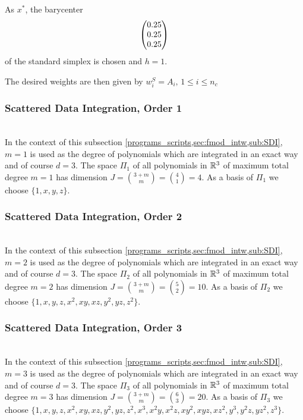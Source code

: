 As $x^\ast$, the barycenter \[ \begin{pmatrix} 0.25 \\ 0.25 \\ 0.25 \end{pmatrix} \] of the standard simplex is chosen and $h = 1$.

The desired weights \weightsS are then given by $w^S_i = A_i,\,1\le i\le n_c$
%
\subsubsection{Scattered Data Integration, Order 1}
%
\\
In the context of this subsection \ref{programs_scripts,sec:fmod_intw,sub:SDI}, $m=1$ is used as the 
degree of polynomials which are integrated in an exact way and of course $d=3$. The space $\Pi_1$ of all polynomials in 
$\mathbb{R}^3$ of maximum total degree $m=1$ has dimension $J = \binom{3+m}{m} = \binom{4}{1} = 4$. As a basis of $\Pi_1$ we choose 
$\big\{1,\allowbreak x,\allowbreak y,\allowbreak z\big\}$.
%
\subsubsection{Scattered Data Integration, Order 2}
%
\\
In the context of this subsection \ref{programs_scripts,sec:fmod_intw,sub:SDI}, $m=2$ is used as the 
degree of polynomials which are integrated in an exact way and of course $d=3$. The space $\Pi_2$ of all polynomials in 
$\mathbb{R}^3$ of maximum total degree $m=2$ has dimension $J = \binom{3+m}{m} = \binom{5}{2} = 10$. As a basis of $\Pi_2$ we choose $\big\{1,
\allowbreak x,\allowbreak y,\allowbreak z,\allowbreak x^2,\allowbreak xy,\allowbreak xz,\allowbreak y^2,
\allowbreak yz,\allowbreak  z^2\big\}$.
%
\subsubsection{Scattered Data Integration, Order 3}
%
\\
In the context of this subsection \ref{programs_scripts,sec:fmod_intw,sub:SDI}, $m=3$ is used as the 
degree of polynomials which are integrated in an exact way and of course $d=3$. The space $\Pi_3$ of all polynomials in 
$\mathbb{R}^3$ of maximum total degree $m=3$ has dimension $J = \binom{3+m}{m} = \binom{6}{3} = 20$. As a basis of $\Pi_3$ we choose $\big\{1,
\allowbreak x,\allowbreak y,\allowbreak z,\allowbreak x^2,\allowbreak xy,\allowbreak xz,\allowbreak y^2,
\allowbreak yz,\allowbreak  z^2,\allowbreak x^3,\allowbreak  x^2y,\allowbreak  x^2z,\allowbreak  xy^2,
\allowbreak  xyz,\allowbreak  xz^2,\allowbreak  y^3,\allowbreak  y^2z,\allowbreak  yz^2,\allowbreak  
z^3\big\}$.
%
